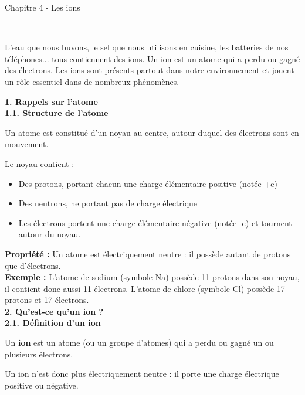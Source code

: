 \documentclass[11pt,a4paper]{article}
\begin{document}
\begin{center}
 \LARGE{Chapitre 4 - Les ions}
\end{center}

\normalsize

\hrule\
\\[0,2cm]

L'eau que nous buvons, le sel que nous utilisons en cuisine, les batteries de nos téléphones... tous contiennent des ions. Un ion est un atome qui a perdu ou gagné des électrons. Les ions sont présents partout dans notre environnement et jouent un rôle essentiel dans de nombreux phénomènes.

\vspace{3mm}

\textbf{1. Rappels sur l'atome} \\

\textbf{1.1. Structure de l'atome}

\begin{tcolorbox}[colback=red!5!white,colframe=red!75!black]
{
Un atome est constitué d'un noyau au centre, autour duquel des électrons sont en mouvement.

Le noyau contient :
\begin{itemize}
    \item Des protons, portant chacun une charge élémentaire positive (notée +e)
    \item Des neutrons, ne portant pas de charge électrique
    \item Les électrons portent une charge élémentaire négative (notée -e) et tournent autour du noyau.
    \end{itemize}
}
\end{tcolorbox}


\textbf{Propriété : } Un atome est électriquement neutre : il possède autant de protons que d'électrons. \\

\textbf{Exemple : } L'atome de sodium (symbole Na) possède 11 protons dans son noyau, il contient donc aussi 11 électrons. L'atome de chlore (symbole Cl) possède 17 protons et 17 électrons. \\

\textbf{2. Qu'est-ce qu'un ion ?} \\

\textbf{2.1. Définition d'un ion}

\begin{tcolorbox}[colback=red!5!white,colframe=red!75!black]
{
Un \textbf{ion} est un atome (ou un groupe d'atomes) qui a perdu ou gagné un ou plusieurs électrons.

Un ion n'est donc plus électriquement neutre : il porte une charge électrique positive ou négative.
}
\end{tcolorbox}
\end{document}
